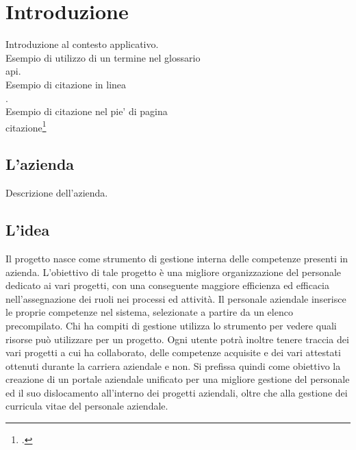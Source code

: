 
\chapter{Introduzione}
\label{cap:introduzione}

Introduzione al contesto applicativo.\\

\noindent Esempio di utilizzo di un termine nel glossario \\
\gls{api}. \\

\noindent Esempio di citazione in linea \\
\cite{site:agile-manifesto}. \\

\noindent Esempio di citazione nel pie' di pagina \\
citazione\footcite{womak:lean-thinking} \\

\section{L'azienda}

Descrizione dell'azienda.

\section{L'idea}

Il progetto \myTitle{} nasce come strumento di gestione interna delle competenze presenti in azienda. L’obiettivo di tale progetto è una migliore organizzazione del personale dedicato ai vari progetti, con una conseguente maggiore efficienza ed efficacia nell’assegnazione dei ruoli nei processi ed attività.
Il personale aziendale inserisce le proprie competenze nel sistema, selezionate a partire da un elenco precompilato. 
Chi ha compiti di gestione utilizza lo strumento per vedere quali risorse può utilizzare per un
progetto. Ogni utente potrà inoltre tenere traccia dei vari progetti a cui ha collaborato, delle competenze acquisite e dei vari attestati ottenuti durante la carriera aziendale e non.
Si prefissa quindi come obiettivo la creazione di un portale aziendale unificato per una migliore gestione del personale ed il suo dislocamento all’interno dei progetti aziendali, oltre che alla gestione dei curricula vitae del personale aziendale.


